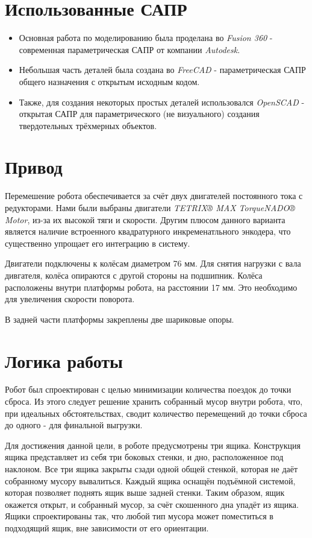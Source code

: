 \documentclass[11pt]{article}
\let\oldsection\section
\renewcommand\section{\pagebreak\oldsection}
\begin{document}
\section{Использованные САПР}
\label{sec:org6de2731}
\begin{itemize}
\item Основная работа по моделированию была проделана во \emph{Fusion 360} - современная параметрическая САПР от компании \emph{Autodesk}.
\item Небольшая часть деталей была создана во \emph{FreeCAD} - параметрическая САПР общего назначения с открытым исходным кодом.
\item Также, для создания некоторых простых деталей использовался \emph{OpenSCAD} - открытая САПР для параметрического (не визуального) создания твердотельных трёхмерных объектов.
\end{itemize}
\section{Привод}
\label{sec:org3877299}
Перемешение робота обеспечивается за счёт двух двигателей постоянного тока с редукторами. Нами были выбраны двигатели \emph{TETRIX® MAX TorqueNADO® Motor}, из-за их высокой тяги и скорости. Другим плюсом данного варианта является наличие встроенного квадратурного инкременатльного энкодера, что существенно упрощает его интеграцию в систему.

Двигатели подключены к колёсам диаметром 76 мм. Для снятия нагрузки с вала дивгателя, колёса опираются с другой стороны на подшипник. Колёса расположены внутри платформы робота, на расстоянии 17 мм. Это необходимо для увеличения скорости поворота.

В задней части платформы закреплены две шариковые опоры.
\section{Логика работы}
\label{sec:orge87443f}
Робот был спроектирован с целью минимизации количества поездок до точки сброса. Из этого следует решение хранить собранный мусор внутри робота, что, при идеальных обстоятельствах, сводит количество перемещений до точки сброса до одного - для финальной выгрузки.

Для достижения данной цели, в роботе предусмотрены три ящика. Конструкция ящика представляет из себя три боковых стенки, и дно, расположенное под наклоном. Все три ящика закрыты сзади одной общей стенкой, которая не даёт собранному мусору вывалиться. Каждый ящика оснащён подъёмной системой, которая позволяет поднять ящик выше задней стенки. Таким образом, ящик окажется открыт, и собранный мусор, за счёт скошенного дна упадёт из ящика.
Ящики спроектированы так, что любой тип мусора может поместиться в подходящий ящик, вне зависимости от его ориентации.
\end{document}
